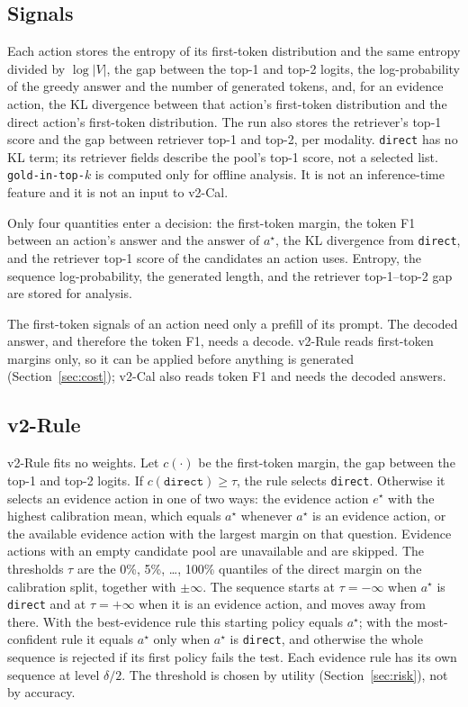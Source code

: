 \documentclass[sigconf,anonymous,review]{acmart}
\begin{document}
\subsection{Signals}
\label{sec:signals}
Each action stores the entropy of its first-token distribution and the same entropy divided by $\log|V|$, the gap between the top-1 and top-2 logits, the log-probability of the greedy answer and the number of generated tokens, and, for an evidence action, the KL divergence between that action's first-token distribution and the direct action's first-token distribution.
The run also stores the retriever's top-1 score and the gap between retriever top-1 and top-2, per modality.
\texttt{direct} has no KL term; its retriever fields describe the pool's top-1 score, not a selected list.
\texttt{gold-in-top-$k$} is computed only for offline analysis.
It is not an inference-time feature and it is not an input to v2-Cal.

Only four quantities enter a decision: the first-token margin, the token F1 between an action's answer and the answer of $a^{\star}$, the KL divergence from \texttt{direct}, and the retriever top-1 score of the candidates an action uses. Entropy, the sequence log-probability, the generated length, and the retriever top-1--top-2 gap are stored for analysis.

The first-token signals of an action need only a prefill of its prompt.
The decoded answer, and therefore the token F1, needs a decode.
v2-Rule reads first-token margins only, so it can be applied before anything is generated (Section~\ref{sec:cost}); v2-Cal also reads token F1 and needs the decoded answers.

\subsection{v2-Rule}
\label{sec:rule}
v2-Rule fits no weights.
Let $c(\cdot)$ be the first-token margin, the gap between the top-1 and top-2 logits.
If $c(\texttt{direct})\ge\tau$, the rule selects \texttt{direct}.
Otherwise it selects an evidence action in one of two ways: the evidence action $e^{\star}$ with the highest calibration mean, which equals $a^{\star}$ whenever $a^{\star}$ is an evidence action, or the available evidence action with the largest margin on that question.
Evidence actions with an empty candidate pool are unavailable and are skipped.
The thresholds $\tau$ are the 0\%, 5\%, \dots, 100\% quantiles of the direct margin on the calibration split, together with $\pm\infty$.
The sequence starts at $\tau=-\infty$ when $a^{\star}$ is \texttt{direct} and at $\tau=+\infty$ when it is an evidence action, and moves away from there. With the best-evidence rule this starting policy equals $a^{\star}$; with the most-confident rule it equals $a^{\star}$ only when $a^{\star}$ is \texttt{direct}, and otherwise the whole sequence is rejected if its first policy fails the test.
Each evidence rule has its own sequence at level $\delta/2$.
The threshold is chosen by utility (Section~\ref{sec:risk}), not by accuracy.
\end{document}
